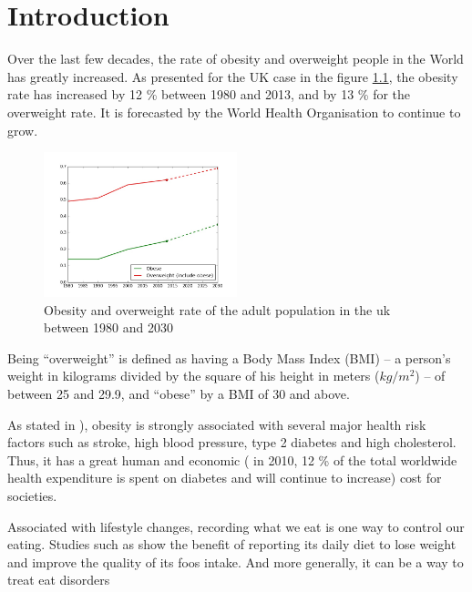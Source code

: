 \chapter{Introduction}

Over the last few decades, the rate of obesity and overweight people in the World has greatly increased. As presented for the UK case in the figure \ref{fig:obesity_uk}, the obesity rate has increased by 12 \% between 1980 and 2013, and by 13 \% for the overweight rate. It is forecasted by the World Health Organisation to continue to grow.

\begin{figure}[h]
    \centering
    \includegraphics[width=0.5\textwidth,  height=0.455\textwidth ]{img/obesity_uk.jpg}
    \caption[Obesity and overweight rate of the adult population in the uk between 1980 and 2030. \textit{Source: World Health Organisation}]{Obesity and overweight rate of the adult population in the uk between 1980 and 2030}
    \label{fig:obesity_uk}
\end{figure}

Being \enquote{overweight} is defined as having a Body Mass Index (BMI) – a person's weight in kilograms divided by the square of his height in meters ($ kg / m^2 $) – of between 25 and 29.9, and \enquote{obese} by a BMI of 30 and above.

As stated in \cite{Mokdad2003}), obesity is strongly associated with several major health risk factors such as stroke, high blood pressure, type 2 diabetes and high cholesterol. Thus, it has a great human and economic (\cite{Zhang2010} in 2010, 12 \% of the total worldwide health expenditure is spent on diabetes and will continue to increase) cost for societies.

Associated with lifestyle changes, recording what we eat is one way to control our eating. Studies such as \cite{Burke2011a} show the benefit of reporting its daily diet to lose weight and improve the quality of its foos intake. And more generally, it can be a way to treat eat disorders

